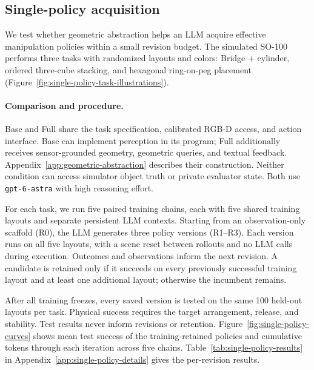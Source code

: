 \subsection{Single-policy acquisition}
\label{sec:single-policy-experiments}

We test whether geometric abstraction helps an LLM acquire effective manipulation
policies within a small revision budget. The simulated SO-100 performs three
tasks with randomized layouts and colors: Bridge + cylinder, ordered three-cube
stacking, and hexagonal ring-on-peg placement
(Figure~\ref{fig:single-policy-task-illustrations}).

\paragraph{Comparison and procedure.}
Base and Full share the task specification, calibrated RGB-D access, and action
interface. Base can implement perception in its program; Full additionally
receives sensor-grounded geometry, geometric queries, and textual feedback.
Appendix~\ref{app:geometric-abstraction} describes their construction.
Neither condition can access simulator object truth or private evaluator state.
Both use \texttt{gpt-6-astra} with high reasoning effort.

For each task, we run five paired training chains, each with five shared training
layouts and separate persistent LLM contexts. Starting from an observation-only
scaffold (R0), the LLM generates three policy versions (R1--R3). Each version runs
on all five layouts, with a scene reset between rollouts and no LLM calls during
execution. Outcomes and observations inform the next revision. A candidate is
retained only if it succeeds on every previously successful training layout and
at least one additional layout; otherwise the incumbent remains.

After all training freezes, every saved version is tested on the same 100 held-out
layouts per task. Physical success requires the target arrangement, release, and
stability. Test results never inform revisions or retention.
Figure~\ref{fig:single-policy-curves} shows mean test success of the
training-retained policies and cumulative tokens through each iteration across
five chains.
Table~\ref{tab:single-policy-results} in
Appendix~\ref{app:single-policy-details} gives the per-revision results.

